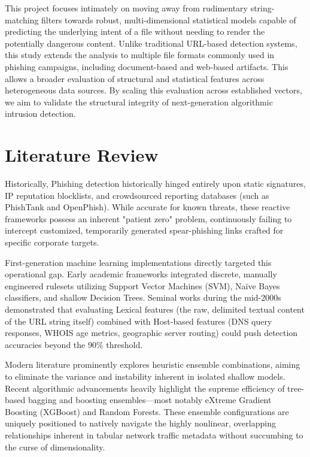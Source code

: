 \documentclass[12pt,a4paper]{article}
\begin{document}
This project focuses intimately on moving away from rudimentary string-matching filters towards robust, multi-dimensional statistical models capable of predicting the underlying intent of a file without needing to render the potentially dangerous content. Unlike traditional URL-based detection systems, this study extends the analysis to multiple file formats commonly used in phishing campaigns, including document-based and web-based artifacts. This allows a broader evaluation of structural and statistical features across heterogeneous data sources. By scaling this evaluation across established vectors, we aim to validate the structural integrity of next-generation algorithmic intrusion detection.

\section{Literature Review}
Historically, Phishing detection historically hinged entirely upon static signatures, IP reputation blocklists, and crowdsourced reporting databases (such as PhishTank and OpenPhish). While accurate for known threats, these reactive frameworks possess an inherent "patient zero" problem, continuously failing to intercept customized, temporarily generated spear-phishing links crafted for specific corporate targets.

First-generation machine learning implementations directly targeted this operational gap. Early academic frameworks integrated discrete, manually engineered rulesets utilizing Support Vector Machines (SVM), Naïve Bayes classifiers, and shallow Decision Trees. Seminal works during the mid-2000s demonstrated that evaluating Lexical features (the raw, delimited textual content of the URL string itself) combined with Host-based features (DNS query responses, WHOIS age metrics, geographic server routing) could push detection accuracies beyond the 90\% threshold.

Modern literature prominently explores heuristic ensemble combinations, aiming to eliminate the variance and instability inherent in isolated shallow models. Recent algorithmic advancements heavily highlight the supreme efficiency of tree-based bagging and boosting ensembles—most notably eXtreme Gradient Boosting (XGBoost) and Random Forests. These ensemble configurations are uniquely positioned to natively navigate the highly nonlinear, overlapping relationships inherent in tabular network traffic metadata without succumbing to the curse of dimensionality.
\end{document}
